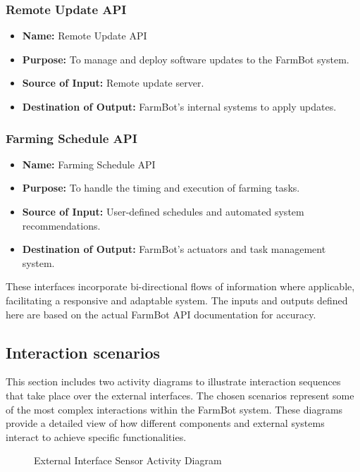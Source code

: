 \subsubsection{Remote Update API}
\begin{itemize}
    \item \textbf{Name:} Remote Update API
    \item \textbf{Purpose:} To manage and deploy software updates to the FarmBot system.
    \item \textbf{Source of Input:} Remote update server.
    \item \textbf{Destination of Output:} FarmBot's internal systems to apply updates.
\end{itemize}


\subsubsection{Farming Schedule API}
\begin{itemize}
    \item \textbf{Name:} Farming Schedule API
    \item \textbf{Purpose:} To handle the timing and execution of farming tasks.
    \item \textbf{Source of Input:} User-defined schedules and automated system recommendations.
    \item \textbf{Destination of Output:} FarmBot's actuators and task management system.
\end{itemize}

These interfaces incorporate bi-directional flows of information where applicable, facilitating a responsive and adaptable system. The inputs and outputs defined here are based on the actual FarmBot API documentation for accuracy.

\subsection{Interaction scenarios}

This section includes two activity diagrams to illustrate interaction sequences that take place over the external interfaces. The chosen scenarios represent some of the most complex interactions within the FarmBot system. These diagrams provide a detailed view of how different components and external systems interact to achieve specific functionalities.

\begin{figure}[H]
    \centering
    
    \caption{External Interface Sensor Activity Diagram}
\end{figure}

